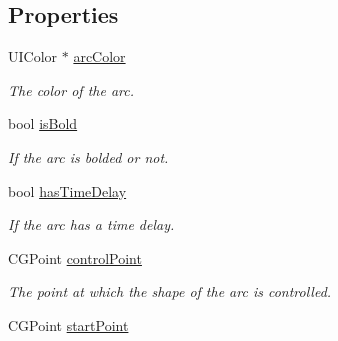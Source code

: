 \subsection*{Properties}
\begin{DoxyCompactItemize}
\item 
\hypertarget{interface_causal_link_view_a8dbba850d3dff258b3106fac49e9bb6e}{U\-I\-Color $\ast$ \hyperlink{interface_causal_link_view_a8dbba850d3dff258b3106fac49e9bb6e}{arc\-Color}}\label{interface_causal_link_view_a8dbba850d3dff258b3106fac49e9bb6e}

\begin{DoxyCompactList}\small\item\em The color of the arc. \end{DoxyCompactList}\item 
\hypertarget{interface_causal_link_view_a323485e127244941fe6689cfbb2a2ac4}{bool \hyperlink{interface_causal_link_view_a323485e127244941fe6689cfbb2a2ac4}{is\-Bold}}\label{interface_causal_link_view_a323485e127244941fe6689cfbb2a2ac4}

\begin{DoxyCompactList}\small\item\em If the arc is bolded or not. \end{DoxyCompactList}\item 
\hypertarget{interface_causal_link_view_a2f7a630acc6a400de7beaf5689d5ab00}{bool \hyperlink{interface_causal_link_view_a2f7a630acc6a400de7beaf5689d5ab00}{has\-Time\-Delay}}\label{interface_causal_link_view_a2f7a630acc6a400de7beaf5689d5ab00}

\begin{DoxyCompactList}\small\item\em If the arc has a time delay. \end{DoxyCompactList}\item 
\hypertarget{interface_causal_link_view_aee10b0d74aca3ca6515a31d8c478f616}{C\-G\-Point \hyperlink{interface_causal_link_view_aee10b0d74aca3ca6515a31d8c478f616}{control\-Point}}\label{interface_causal_link_view_aee10b0d74aca3ca6515a31d8c478f616}

\begin{DoxyCompactList}\small\item\em The point at which the shape of the arc is controlled. \end{DoxyCompactList}\item 
\hypertarget{interface_causal_link_view_af5c8aa466e345adfab2e58ba5509edad}{C\-G\-Point \hyperlink{interface_causal_link_view_af5c8aa466e345adfab2e58ba5509edad}{start\-Point}}\label{interface_causal_link_view_af5c8aa466e345adfab2e58ba5509edad}


\end{DoxyCompactItemize}
